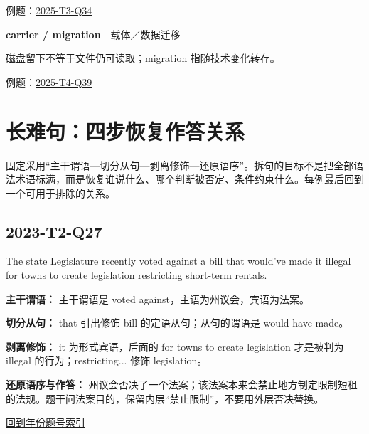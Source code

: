 \documentclass[11pt,a4paper]{article}
\begin{document}
\noindent\small 例题：\hyperref[idx-2025-T3-Q34]{2025-T3-Q34}\normalsize\par\medskip
{}\noindent\textbf{carrier / migration}　载体／数据迁移\par\nopagebreak
磁盘留下不等于文件仍可读取；migration 指随技术变化转存。

\noindent\small 例题：\hyperref[idx-2025-T4-Q39]{2025-T4-Q39}\normalsize\par\medskip
\clearpage\section{长难句：四步恢复作答关系}\label{syntax}
固定采用“主干谓语—切分从句—剥离修饰—还原语序”。拆句的目标不是把全部语法术语标满，而是恢复谁说什么、哪个判断被否定、条件约束什么。每例最后回到一个可用于排除的关系。

\subsection{2023-T2-Q27}
\begin{evidence}The state Legislature recently voted against a bill that would’ve made it illegal for towns to create legislation restricting short-term rentals.\end{evidence}
\noindent\textbf{主干谓语：} 主干谓语是 voted against，主语为州议会，宾语为法案。\par\smallskip
\noindent\textbf{切分从句：} that 引出修饰 bill 的定语从句；从句的谓语是 would have made。\par\smallskip
\noindent\textbf{剥离修饰：} it 为形式宾语，后面的 for towns to create legislation 才是被判为 illegal 的行为；restricting... 修饰 legislation。\par\smallskip
\noindent\textbf{还原语序与作答：} 州议会否决了一个法案；该法案本来会禁止地方制定限制短租的法规。题干问法案目的，保留内层“禁止限制”，不要用外层否决替换。\par\smallskip
\hyperref[idx-2023-T2-Q27]{回到年份题号索引}\par
\end{document}

